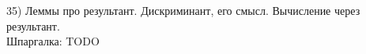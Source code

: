 35) Леммы про результант. Дискриминант, его смысл. Вычисление через результант.\\
Шпаргалка: TODO\\
